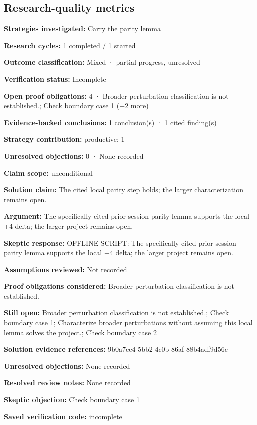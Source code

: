\documentclass[11pt]{article}
\begin{document}
\subsection{Research-quality metrics}
\textbf{Strategies investigated:} Carry the parity lemma\par
\textbf{Research cycles:} 1 completed / 1 started\par
\textbf{Outcome classification:} Mixed · partial progress, unresolved\par
\textbf{Verification status:} Incomplete\par
\textbf{Open proof obligations:} 4 · Broader perturbation classification is not established.; Check boundary case 1 (+2 more)\par
\textbf{Evidence-backed conclusions:} 1 conclusion(s) · 1 cited finding(s)\par
\textbf{Strategy contribution:} productive: 1\par
\textbf{Unresolved objections:} 0 · None recorded\par
\textbf{Claim scope:} unconditional\par
\textbf{Solution claim:} The cited local parity step holds; the larger characterization remains open.\par
\textbf{Argument:} The specifically cited prior-session parity lemma supports the local +4 delta; the larger project remains open.\par
\textbf{Skeptic response:} OFFLINE SCRIPT: The specifically cited prior-session parity lemma supports the local +4 delta; the larger project remains open.\par
\textbf{Assumptions reviewed:} Not recorded\par
\textbf{Proof obligations considered:} Broader perturbation classification is not established.\par
\textbf{Still open:} Broader perturbation classification is not established.; Check boundary case 1; Characterize broader perturbations without assuming this local lemma solves the project.; Check boundary case 2\par
\textbf{Solution evidence references:} 9b0a7ce4-5bb2-4c0b-86af-88b4adf9d56c\par
\textbf{Unresolved objections:} None recorded\par
\textbf{Resolved review notes:} None recorded\par
\textbf{Skeptic objection:} Check boundary case 1\par
\textbf{Saved verification code:} incomplete\par
\end{document}
